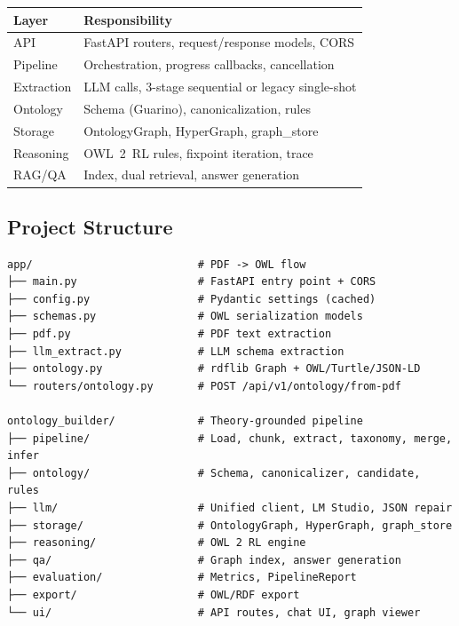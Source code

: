 \documentclass[11pt,a4paper]{article}
\begin{document}
\begin{center}
\begin{tabular}{@{}ll@{}}
\toprule
\textbf{Layer} & \textbf{Responsibility} \\
\midrule
API & FastAPI routers, request/response models, CORS \\
Pipeline & Orchestration, progress callbacks, cancellation \\
Extraction & LLM calls, 3-stage sequential or legacy single-shot \\
Ontology & Schema (Guarino), canonicalization, rules \\
Storage & OntologyGraph, HyperGraph, graph\_store \\
Reasoning & OWL~2~RL rules, fixpoint iteration, trace \\
RAG/QA & Index, dual retrieval, answer generation \\
\bottomrule
\end{tabular}
\end{center}

\subsection{Project Structure}

\begin{verbatim}
app/                          # PDF -> OWL flow
├── main.py                   # FastAPI entry point + CORS
├── config.py                 # Pydantic settings (cached)
├── schemas.py                # OWL serialization models
├── pdf.py                    # PDF text extraction
├── llm_extract.py            # LLM schema extraction
├── ontology.py               # rdflib Graph + OWL/Turtle/JSON-LD
└── routers/ontology.py       # POST /api/v1/ontology/from-pdf

ontology_builder/             # Theory-grounded pipeline
├── pipeline/                 # Load, chunk, extract, taxonomy, merge, infer
├── ontology/                 # Schema, canonicalizer, candidate, rules
├── llm/                      # Unified client, LM Studio, JSON repair
├── storage/                  # OntologyGraph, HyperGraph, graph_store
├── reasoning/                # OWL 2 RL engine
├── qa/                       # Graph index, answer generation
├── evaluation/               # Metrics, PipelineReport
├── export/                   # OWL/RDF export
└── ui/                       # API routes, chat UI, graph viewer
\end{verbatim}

\end{document}
